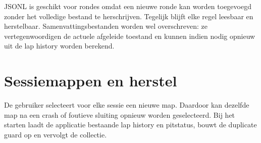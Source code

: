 JSONL is geschikt voor rondes omdat een nieuwe ronde kan worden toegevoegd zonder het volledige
bestand te herschrijven. Tegelijk blijft elke regel leesbaar en herstelbaar. Samenvattingsbestanden
worden wel overschreven: ze vertegenwoordigen de actuele afgeleide toestand en kunnen indien nodig
opnieuw uit de lap history worden berekend.

\section{Sessiemappen en herstel}
De gebruiker selecteert voor elke sessie een nieuwe map. Daardoor kan dezelfde map na een crash of
foutieve sluiting opnieuw worden geselecteerd. Bij het starten laadt de applicatie bestaande lap
history en pitstatus, bouwt de duplicate guard op en vervolgt de collectie.
